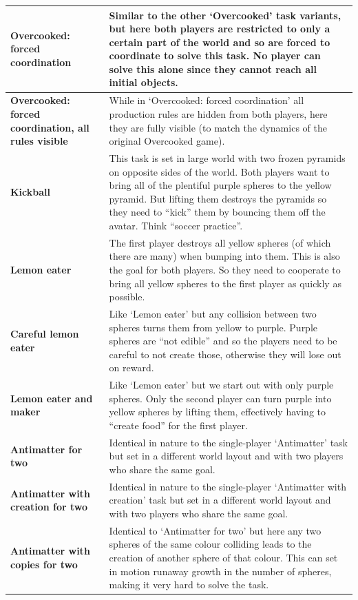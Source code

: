 \documentclass[11pt, a4paper, logo, copyright]{deepmind}
\begin{document}
\begin{appendix}
\begin{longtable}{|>{\raggedright}p{4cm}|p{12cm}|}
\textbf{Overcooked: forced coordination} & Similar to the other `Overcooked' task variants, but here both players are restricted to only a certain part of the world and so are forced to coordinate to solve this task. No player can solve this alone since they cannot reach all initial objects. \\ \hline
\textbf{Overcooked: forced coordination, all rules visible} & While in `Overcooked: forced coordination' all production rules are hidden from both players, here they are fully visible (to match the dynamics of the original Overcooked game). \\ \hline
\textbf{Kickball} & This task is set in large world with two frozen pyramids on opposite sides of the world. Both players want to bring all of the plentiful purple spheres to the yellow pyramid. But lifting them destroys the pyramids so they need to ``kick'' them by bouncing them off the avatar. Think ``soccer practice''. \\ \hline
\textbf{Lemon eater} & The first player destroys all yellow spheres (of which there are many) when bumping into them. This is also the goal for both players. So they need to cooperate to bring all yellow spheres to the first player as quickly as possible. \\ \hline
\textbf{Careful lemon eater} & Like `Lemon eater' but any collision between two spheres turns them from yellow to purple. Purple spheres are ``not edible'' and so the players need to be careful to not create those, otherwise they will lose out on reward. \\ \hline
\textbf{Lemon eater and maker} & Like `Lemon eater' but we start out with only purple spheres. Only the second player can turn purple into yellow spheres by lifting them, effectively having to ``create food'' for the first player. \\ \hline
\textbf{Antimatter for two} & Identical in nature to the single-player `Antimatter' task but set in a different world layout and with two players who share the same goal. \\ \hline
\textbf{Antimatter with creation for two} & Identical in nature to the single-player `Antimatter with creation' task but set in a different world layout and with two players who share the same goal. \\ \hline
\textbf{Antimatter with copies for two} & Identical to `Antimatter for two' but here any two spheres of the same colour colliding leads to the creation of another sphere of that colour. This can set in motion runaway growth in the number of spheres, making it very hard to solve the task. \\ \hline

\end{longtable}
\end{appendix}
\end{document}
